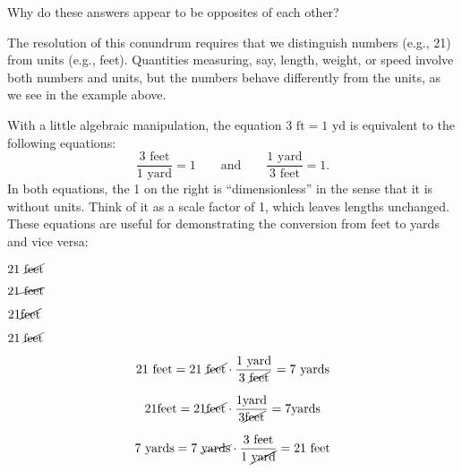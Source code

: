 \documentclass[nooutcomes]{ximera}
\begin{document}
Why do these answers appear to be opposites of each other?  

The resolution of this conundrum requires that we distinguish numbers (e.g., 21) from units (e.g., feet).  Quantities measuring, say, length, weight, or speed involve both numbers and units, but the numbers behave differently from the units, as we see in the example above.  

With a little algebraic manipulation, the equation $3\textrm{ ft} = 1 \textrm{ yd}$ is equivalent to the following equations:  
\[
\frac{3\textrm{ feet}}{1 \textrm{ yard}} = 1\qquad \textrm{and}\qquad \frac{1 \textrm{ yard}}{3\textrm{ feet}} = 1.
\]
In both equations, the 1 on the right is ``dimensionless'' in the sense that it is without units.  Think of it as a scale factor of 1, which leaves lengths unchanged.  These equations are useful for demonstrating the conversion from feet to yards and vice versa:  

%

$21\textrm{ \cancel{feet}}$

$21 \cancel{\textrm{ feet}}$

$21\cancel{\textrm{feet}}$

$21\;\cancel{\textrm{feet}}$




\[
21\ \textrm{feet} = 21\ \cancel{\textrm{feet}} \cdot \frac{{1\ \textrm{yard}}}{3\ \cancel{\textrm{feet}}} = 7\ \textrm{yards}
\]

\[
21 \textrm{feet} = 21 \cancel{\textrm{feet}} \cdot \frac{{1 \textrm{yard}}}{3 \cancel{\textrm{feet}}} = 7 \textrm{yards}
\]


\[
7\textrm{ yards} = 7\textrm{ \cancel{yards}} \cdot \frac{{3 \textrm{ feet}}}{1\textrm{ \cancel{yard}}} = 
21\textrm{ feet}
\]
\end{document}
